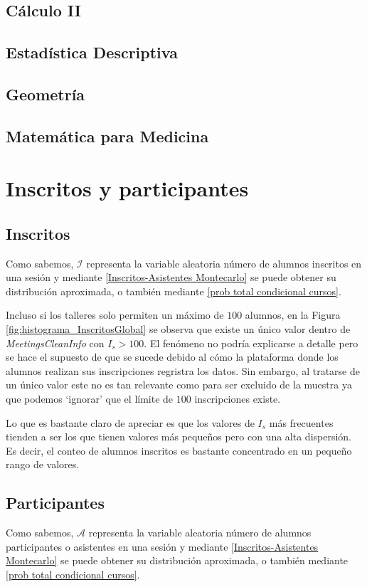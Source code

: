 \documentclass[11pt,a4paper]{book}
\theoremstyle{definition}%
\begin{document}
            \subsection{Cálculo II}
            \subsection{Estadística Descriptiva}
            \subsection{Geometría}
            \subsection{Matemática para Medicina}
        \section{Inscritos y participantes}
            \subsection{Inscritos}
                Como sabemos, $\mathcal{I}$ representa la variable aleatoria número de alumnos inscritos en una sesión y mediante \ref{Inscritos-Asistentes Montecarlo} se puede obtener su distribución aproximada, o también mediante \ref{prob total condicional cursos}.

                Incluso si los talleres solo permiten un máximo de $100$ alumnos, en la Figura \ref{fig:histograma_InscritosGlobal} se observa que existe un único valor dentro de \textit{MeetingsCleanInfo} con $I_s>100$. El fenómeno no podría explicarse a detalle pero se hace el supuesto de que se sucede debido al cómo la plataforma donde los alumnos realizan sus inscripciones regristra los datos. Sin embargo, al tratarse de un único valor este no es tan relevante como para ser excluido de la muestra ya que podemos `ignorar' que el límite de $100$ inscripciones existe.

                Lo que es bastante claro de apreciar es que los valores de $I_s$ más frecuentes tienden a ser los que tienen valores más pequeños pero con una alta dispersión. Es decir, el conteo de alumnos inscritos es bastante concentrado en un pequeño rango de valores.
            \subsection{Participantes}
                Como sabemos, $\mathcal{A}$ representa la variable aleatoria número de alumnos participantes o asistentes en una sesión y mediante \ref{Inscritos-Asistentes Montecarlo} se puede obtener su distribución aproximada, o también mediante \ref{prob total condicional cursos}.
\end{document}
